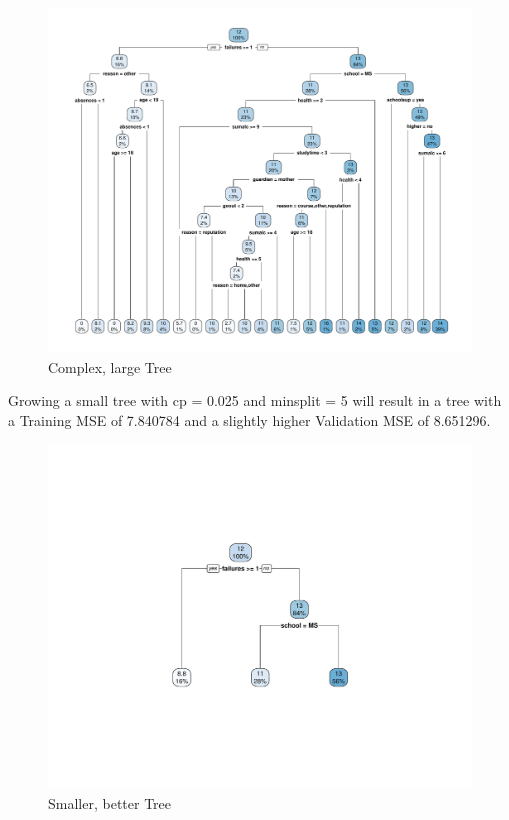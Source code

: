 \documentclass[12pt]{article}
\begin{document}
\begin{figure}
    \centering
    \includegraphics[scale=0.30]{big_manual_tree.pdf}
    \caption{Complex, large Tree}
\end{figure}

Growing a small tree with cp = 0.025 and minsplit = 5 will result in a tree with a Training MSE of 7.840784 and a slightly higher Validation MSE of 8.651296.

\begin{figure}
    \centering
    \includegraphics[scale=0.30]{small_manual_tree.pdf}
    \caption{Smaller, better Tree}
\end{figure}
\end{document}
